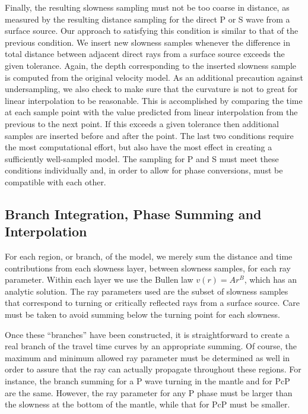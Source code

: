 Finally, the resulting slowness sampling must not be too coarse in distance, as
measured by the resulting distance sampling for the direct P or S wave from a surface
source.  Our approach to satisfying this condition is 
similar to that of the previous condition. We insert new slowness samples 
whenever the difference in total distance between adjacent direct rays 
from a surface source exceeds the given tolerance.
Again, the depth corresponding to the inserted slowness sample is computed
from the original velocity model.
As an additional precaution against undersampling, we also check to make sure 
that the curvature is not to great for linear interpolation to be reasonable.
This is accomplished by comparing the time at each sample point with the
value predicted from linear interpolation from the previous to the next point.
If this exceeds a given tolerance then additional samples are inserted before
and after the point.
The last two conditions require the most computational effort, but also have the most effect in creating a sufficiently well-sampled model.
The sampling for P and S must meet these conditions individually and,
in order to allow for phase conversions, must be compatible with each other.

\subsection*{Branch Integration, Phase Summing and Interpolation}

For each region, or branch, of the model, we merely sum the distance and time
contributions from each slowness layer, between slowness samples, 
for each ray parameter. 
Within each layer we use the Bullen law $v(r) = A r^B$, which has an 
analytic solution.
The ray parameters used are the subset of slowness samples that correspond to
turning or critically reflected rays from a surface source.
Care must be taken to 
avoid summing below the turning point for each slowness.

Once these ``branches'' have been constructed, it is straightforward to create
a real branch of the travel time curves by an appropriate summing.
Of course, the maximum and minimum allowed ray parameter must be determined 
as well in order to assure that the ray can actually propagate throughout these
regions. For instance, the branch summing for a P wave turning in the mantle
and for PcP are the same. However, the ray parameter for any P phase must 
be larger than
the slowness at the bottom of the mantle, while that for PcP must be smaller.

